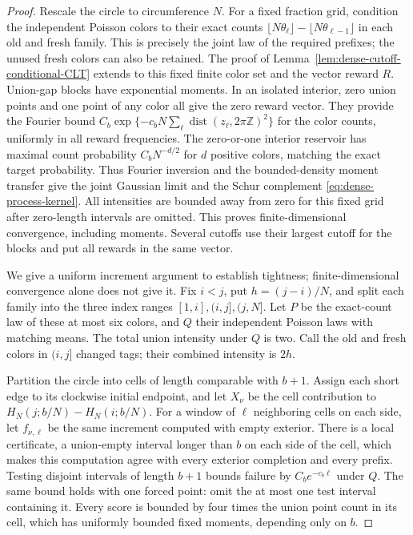\documentclass[11pt,letterpaper]{article}
\begin{document}
\begin{proof}
Rescale the circle to circumference $N$. For a fixed
fraction grid, condition the independent Poisson colors
to their exact counts
$\lfloor N\theta_\ell\rfloor-\lfloor N\theta_{\ell-1}\rfloor$
in each old and fresh family.
This is precisely the joint law of the required prefixes;
the unused fresh colors can also be retained.
The proof of Lemma~\ref{lem:dense-cutoff-conditional-CLT}
extends to this fixed finite color set and the vector
reward $R$. Union-gap blocks have exponential moments.
In an isolated interior, zero union points and one point
of any color all give the zero reward vector.
They provide the Fourier bound
$C_b\exp\{-c_bN\sum_\ell\operatorname{dist}(z_\ell,2\pi\mathbb Z)^2\}$
for the color counts, uniformly in all reward frequencies.
The zero-or-one interior reservoir has maximal count
probability $C_bN^{-d/2}$ for $d$ positive colors,
matching the exact target probability.
Thus Fourier inversion and the bounded-density moment
transfer give the joint Gaussian limit and the Schur
complement \eqref{eq:dense-process-kernel}.
All intensities are bounded away from zero for this fixed
grid after zero-length intervals are omitted.
This proves finite-dimensional convergence, including
moments. Several cutoffs use their largest cutoff for the
blocks and put all rewards in the same vector.

We give a uniform increment argument to establish
tightness; finite-dimensional convergence alone does not
give it. Fix $i<j$, put $h=(j-i)/N$, and split each
family into the three index ranges
$[1,i],(i,j],(j,N]$.
Let $P$ be the exact-count law of these at most six colors,
and $Q$ their independent Poisson laws with matching means.
The total union intensity under $Q$ is two.
Call the old and fresh colors in $(i,j]$ changed tags;
their combined intensity is $2h$.

Partition the circle into cells of length comparable
with $b+1$. Assign each short edge to its clockwise
initial endpoint, and let $X_\nu$ be the cell contribution
to $H_N(j;b/N)-H_N(i;b/N)$.
For a window of $\ell$ neighboring cells on each side,
let $f_{\nu,\ell}$ be the same increment computed with
empty exterior. There is a local certificate, a union-empty
interval longer than $b$ on each side of the cell, which
makes this computation agree with every exterior completion
and every prefix. Testing disjoint intervals of length
$b+1$ bounds failure by $C_be^{-c_b\ell}$ under $Q$.
The same bound holds with one forced point: omit the at
most one test interval containing it.
Every score is bounded by four times the union point
count in its cell, which has uniformly bounded fixed
moments, depending only on $b$.


\end{proof}
\end{document}
